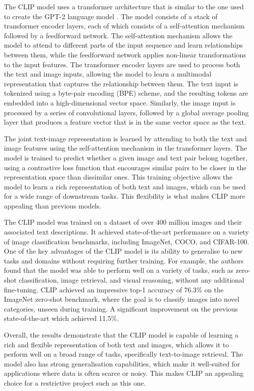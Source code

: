 \documentclass{l4proj}
\begin{document}
The CLIP model uses a transformer architecture that is similar to the one used to create the GPT-2 language model \citep{radford2019gpt2}. The model consists of a stack of transformer encoder layers, each of which consists of a self-attention mechanism followed by a feedforward network. The self-attention mechanism allows the model to attend to different parts of the input sequence and learn relationships between them, while the feedforward network applies non-linear transformations to the input features. The transformer encoder layers are used to process both the text and image inputs, allowing the model to learn a multimodal representation that captures the relationship between them. The text input is tokenized using a byte-pair encoding (BPE) scheme, and the resulting tokens are embedded into a high-dimensional vector space. Similarly, the image input is processed by a series of convolutional layers, followed by a global average pooling layer that produces a feature vector that is in the same vector space as the text.

The joint text-image representation is learned by attending to both the text and image features using the self-attention mechanism in the transformer layers. The model is trained to predict whether a given image and text pair belong together, using a contrastive loss function that encourages similar pairs to be closer in the representation space than dissimilar ones. This training objective allows the model to learn a rich representation of both text and images, which can be used for a wide range of downstream tasks. This flexibility is what makes CLIP more appealing than previous models.

The CLIP model was trained on a dataset of over 400 million images and their associated text descriptions. It achieved state-of-the-art performance on a variety of image classification benchmarks, including ImageNet, COCO, and CIFAR-100. One of the key advantages of the CLIP model is its ability to generalise to new tasks and domains without requiring further training. For example, the authors found that the model was able to perform well on a variety of tasks, such as zero-shot classification, image retrieval, and visual reasoning, without any additional fine-tuning. CLIP achieved an impressive top-1 accuracy of 76.3\% on the ImageNet zero-shot benchmark, where the goal is to classify images into novel categories, unseen during training. A significant improvement on the previous state-of-the-art which achieved 11.5\%.

Overall, the results demonstrate that the CLIP model is capable of learning a rich and flexible representation of both text and images, which allows it to perform well on a broad range of tasks, specifically text-to-image retrieval. The model also has strong generalisation capabilities, which make it well-suited for applications where data is often scarce or noisy. This makes CLIP an appealing choice for a restrictive project such as this one.
\end{document}
